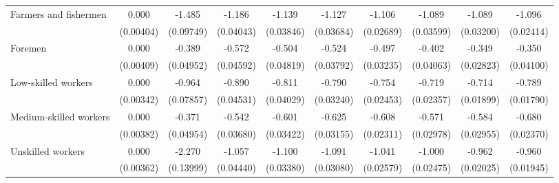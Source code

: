 {\begin{tabular}{l*{9}{c}}
Farmers and fishermen&       0.000         &      -1.485\sym{***}&      -1.186\sym{***}&      -1.139\sym{***}&      -1.127\sym{***}&      -1.106\sym{***}&      -1.089\sym{***}&      -1.089\sym{***}&      -1.096\sym{***}\\
                    &   (0.00404)         &   (0.09749)         &   (0.04043)         &   (0.03846)         &   (0.03684)         &   (0.02689)         &   (0.03599)         &   (0.03200)         &   (0.02414)         \\
Foremen             &       0.000         &      -0.389\sym{***}&      -0.572\sym{***}&      -0.504\sym{***}&      -0.524\sym{***}&      -0.497\sym{***}&      -0.402\sym{***}&      -0.349\sym{***}&      -0.350\sym{***}\\
                    &   (0.00409)         &   (0.04952)         &   (0.04592)         &   (0.04819)         &   (0.03792)         &   (0.03235)         &   (0.04063)         &   (0.02823)         &   (0.04100)         \\
Low-skilled workers &       0.000         &      -0.964\sym{***}&      -0.890\sym{***}&      -0.811\sym{***}&      -0.790\sym{***}&      -0.754\sym{***}&      -0.719\sym{***}&      -0.714\sym{***}&      -0.789\sym{***}\\
                    &   (0.00342)         &   (0.07857)         &   (0.04531)         &   (0.04029)         &   (0.03240)         &   (0.02453)         &   (0.02357)         &   (0.01899)         &   (0.01790)         \\
Medium-skilled workers&       0.000         &      -0.371\sym{***}&      -0.542\sym{***}&      -0.601\sym{***}&      -0.625\sym{***}&      -0.608\sym{***}&      -0.571\sym{***}&      -0.584\sym{***}&      -0.680\sym{***}\\
                    &   (0.00382)         &   (0.04954)         &   (0.03680)         &   (0.03422)         &   (0.03155)         &   (0.02311)         &   (0.02978)         &   (0.02955)         &   (0.02370)         \\
Unskilled workers   &       0.000         &      -2.270\sym{***}&      -1.057\sym{***}&      -1.100\sym{***}&      -1.091\sym{***}&      -1.041\sym{***}&      -1.000\sym{***}&      -0.962\sym{***}&      -0.960\sym{***}\\
                    &   (0.00362)         &   (0.13999)         &   (0.04440)         &   (0.03380)         &   (0.03080)         &   (0.02579)         &   (0.02475)         &   (0.02025)         &   (0.01945)         \\

\end{tabular}}
